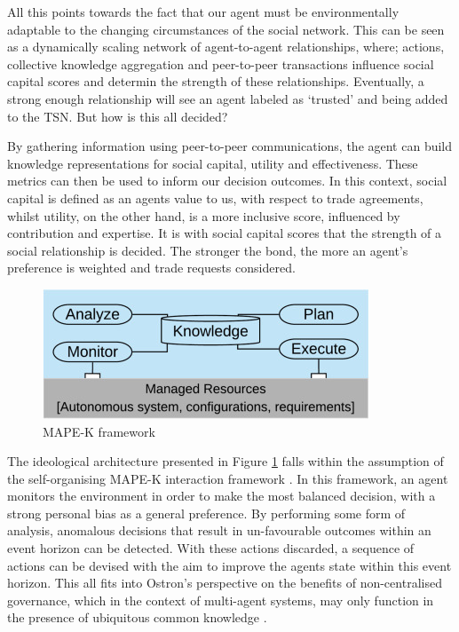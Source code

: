         All this points towards the fact that our agent must be environmentally adaptable to the changing circumstances of the social network. This can be seen as a dynamically scaling network of agent-to-agent relationships, where; actions, collective knowledge aggregation and peer-to-peer transactions influence social capital scores and determin the strength of these relationships. Eventually, a strong enough relationship will see an agent labeled as `trusted' and being added to the TSN. But how is this all decided? 

        By gathering information using peer-to-peer communications, the agent can build knowledge representations for social capital, utility and effectiveness. These metrics can then be used to inform our decision outcomes. In this context, social capital is defined as an agents value to us, with respect to trade agreements, whilst utility, on the other hand, is a more inclusive score, influenced by contribution and expertise. It is with social capital scores that the strength of a social relationship is decided. The stronger the bond, the more an agent's preference is weighted and trade requests considered. 

        \begin{figure}[htb]
            \centering
            \includegraphics{006_team_3_agent_design/FIGS/mapek.jpg}
            \caption{MAPE-K framework}
            \label{fig:mapek_framework}
        \end{figure}

        The ideological architecture presented in Figure \ref{fig:mapek_framework} falls within the assumption of the self-organising MAPE-K interaction framework \cite{mapek}. In this framework, an agent monitors the environment in order to make the most balanced decision, with a strong personal bias as a general preference. By performing some form of analysis, anomalous decisions that result in un-favourable outcomes within an event horizon can be detected. With these actions discarded, a sequence of actions can be devised with the aim to improve the agents state within this event horizon. This all fits into Ostron's perspective on the benefits of non-centralised governance, which in the context of multi-agent systems, may only function in the presence of ubiquitous common knowledge \cite{pitt}. 
        


